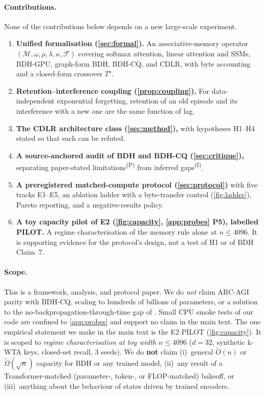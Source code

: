 \documentclass[10pt]{article}
\theoremstyle{remark}
\newcommand{\PS}{\textsuperscript{(P)}}
\newcommand{\IN}{\textsuperscript{(I)}}
\newcommand{\cdlr}{\textsc{CDLR}}
\begin{document}
\paragraph{Contributions.} None of the contributions below depends on a new large-scale experiment.
\begin{enumerate}[label=\textbf{C\arabic*.},leftmargin=*,itemsep=1pt]
\item \textbf{Unified formalisation (\cref{sec:formal}).} An associative-memory operator
$(\mathcal{M},\omega,\rho,\lambda,\kappa,\mathcal{F})$ covering softmax attention, linear attention and SSMs,
BDH-GPU, graph-form BDH, BDH-CQ, and \cdlr{}, with byte accounting and a closed-form crossover $T^\star$.
\item \textbf{Retention--interference coupling (\cref{prop:coupling}).} For data-independent exponential forgetting,
retention of an old episode and its interference with a new one are the same function of lag.
\item \textbf{The \cdlr{} architecture class (\cref{sec:method}),} with hypotheses H1--H4 stated so that each can be
refuted.
\item \textbf{A source-anchored audit of BDH and BDH-CQ (\cref{sec:critique}),} separating paper-stated
limitations\PS{} from inferred gaps\IN.
\item \textbf{A preregistered matched-compute protocol (\cref{sec:protocol})} with five tracks E1--E5, an ablation
ladder with a byte-transfer control (\cref{fig:ladder}), Pareto reporting, and a negative-results policy.
\item \textbf{A toy capacity pilot of E2 (\cref{fig:capacity}, \cref{app:probes} P5), labelled PILOT.} A regime
characterisation of the memory rule alone at $n\le4096$. It is supporting evidence for the protocol's design, not a
test of H1 or of BDH Claim~7.
\end{enumerate}

\paragraph{Scope.} This is a framework, analysis, and protocol paper. We do \emph{not} claim ARC-AGI parity with
BDH-CQ, scaling to hundreds of billions of parameters, or a solution to the no-backpropagation-through-time gap
of \citet[\S7.2]{kosowski2025bdh}. Small CPU smoke tests of our code are confined to \cref{app:probes} and support
no claim in the main text. The one empirical statement we make in the main text is the E2 PILOT
(\cref{fig:capacity}). It is scoped to \emph{regime characterisation at toy width $n\le4096$} ($d=32$, synthetic
k-WTA keys, closed-set recall, 3 seeds). We do \textbf{not} claim (i)~general $\tilde O(n)$ or $\tilde\Omega(\sqrt n)$
capacity for BDH or any trained model, (ii)~any result of a Transformer-matched (parameter-, token-, or FLOP-matched)
bakeoff, or (iii)~anything about the behaviour of states driven by trained encoders.
\end{document}
